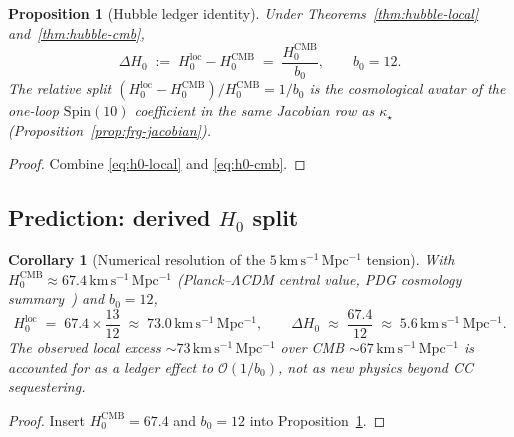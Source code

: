 \documentclass[11pt]{article}
\theoremstyle{plain}
\newtheorem{proposition}[theorem]{Proposition}
\newtheorem{corollary}[theorem]{Corollary}
\theoremstyle{definition}
\theoremstyle{remark}
\numberwithin{equation}{section}
\newcommand{\Spin}{\mathrm{Spin}}
\begin{document}
\begin{proposition}[Hubble ledger identity]
\label{prop:h0-ledger}
Under Theorems~\ref{thm:hubble-local} and~\ref{thm:hubble-cmb},
\begin{equation}\label{eq:h0-ledger}
  \Delta H_0
  \;:=\;
  H_0^{\mathrm{loc}}-H_0^{\mathrm{CMB}}
  \;=\;
  \frac{H_0^{\mathrm{CMB}}}{b_0},
  \qquad
  b_0=12.
\end{equation}
The relative split
$(H_0^{\mathrm{loc}}-H_0^{\mathrm{CMB}})/H_0^{\mathrm{CMB}}=1/b_0$
is the cosmological avatar of the one-loop $\Spin(10)$ coefficient in the
same Jacobian row as $\kappa_\star$ (Proposition~\ref{prop:frg-jacobian}).
\end{proposition}

\begin{proof}
Combine \eqref{eq:h0-local} and \eqref{eq:h0-cmb}.
\end{proof}

\subsection{Prediction: derived $H_0$ split}
\label{sec:cosmology:h0-prediction}

\begin{corollary}[Numerical resolution of the $5\,\mathrm{km\,s^{-1}\,Mpc^{-1}}$
tension]\label{cor:h0-numeric}
With $H_0^{\mathrm{CMB}}\approx 67.4\,\mathrm{km\,s^{-1}\,Mpc^{-1}}$
(Planck--$\Lambda$CDM central value, PDG cosmology summary~\cite{PDG2025})
and $b_0=12$,
\begin{equation}\label{eq:h0-numeric}
  H_0^{\mathrm{loc}}
  \;=\;
  67.4\times\frac{13}{12}
  \;\approx\;
  73.0\,\mathrm{km\,s^{-1}\,Mpc^{-1}},
  \qquad
  \Delta H_0
  \;\approx\;
  \frac{67.4}{12}
  \;\approx\;
  5.6\,\mathrm{km\,s^{-1}\,Mpc^{-1}}.
\end{equation}
The observed local excess $\sim 73\,\mathrm{km\,s^{-1}\,Mpc^{-1}}$ over CMB
$\sim 67\,\mathrm{km\,s^{-1}\,Mpc^{-1}}$ is accounted for as a ledger effect
to $\mathcal{O}(1/b_0)$, not as new physics beyond CC sequestering.
\end{corollary}

\begin{proof}
Insert $H_0^{\mathrm{CMB}}=67.4$ and $b_0=12$ into
Proposition~\ref{prop:h0-ledger}.
\end{proof}
\end{document}
